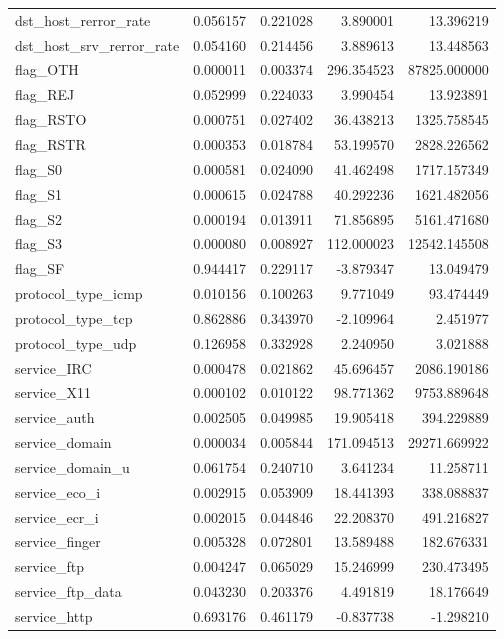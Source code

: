 \documentclass[12pt,a4paper]{article}
\begin{document}
\begin{longtable}{lrrrr}
  dst_host_rerror_rate & 0.056157 & 0.221028 & 3.890001 & 13.396219 \\
  dst_host_srv_rerror_rate & 0.054160 & 0.214456 & 3.889613 & 13.448563 \\
  flag_OTH & 0.000011 & 0.003374 & 296.354523 & 87825.000000 \\
  flag_REJ & 0.052999 & 0.224033 & 3.990454 & 13.923891 \\
  flag_RSTO & 0.000751 & 0.027402 & 36.438213 & 1325.758545 \\
  flag_RSTR & 0.000353 & 0.018784 & 53.199570 & 2828.226562 \\
  flag_S0 & 0.000581 & 0.024090 & 41.462498 & 1717.157349 \\
  flag_S1 & 0.000615 & 0.024788 & 40.292236 & 1621.482056 \\
  flag_S2 & 0.000194 & 0.013911 & 71.856895 & 5161.471680 \\
  flag_S3 & 0.000080 & 0.008927 & 112.000023 & 12542.145508 \\
  flag_SF & 0.944417 & 0.229117 & -3.879347 & 13.049479 \\
  protocol_type_icmp & 0.010156 & 0.100263 & 9.771049 & 93.474449 \\
  protocol_type_tcp & 0.862886 & 0.343970 & -2.109964 & 2.451977 \\
  protocol_type_udp & 0.126958 & 0.332928 & 2.240950 & 3.021888 \\
  service_IRC & 0.000478 & 0.021862 & 45.696457 & 2086.190186 \\
  service_X11 & 0.000102 & 0.010122 & 98.771362 & 9753.889648 \\
  service_auth & 0.002505 & 0.049985 & 19.905418 & 394.229889 \\
  service_domain & 0.000034 & 0.005844 & 171.094513 & 29271.669922 \\
  service_domain_u & 0.061754 & 0.240710 & 3.641234 & 11.258711 \\
  service_eco_i & 0.002915 & 0.053909 & 18.441393 & 338.088837 \\
  service_ecr_i & 0.002015 & 0.044846 & 22.208370 & 491.216827 \\
  service_finger & 0.005328 & 0.072801 & 13.589488 & 182.676331 \\
  service_ftp & 0.004247 & 0.065029 & 15.246999 & 230.473495 \\
  service_ftp_data & 0.043230 & 0.203376 & 4.491819 & 18.176649 \\
  service_http & 0.693176 & 0.461179 & -0.837738 & -1.298210 \\

\end{longtable}
\end{document}
